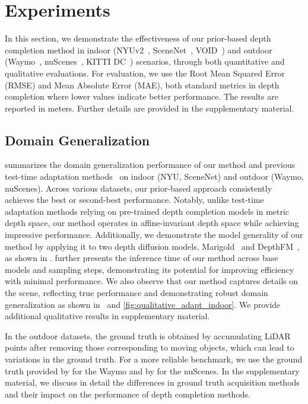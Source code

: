 
\section{Experiments}
In this section, we demonstrate the effectiveness of our prior-based depth completion method in indoor (NYUv2~\cite{silberman2012nyu}, SceneNet~\cite{mccormac2017scenenet}, VOID~\cite{wong2020void}) and outdoor (Waymo~\cite{sun2020waymo}, nuScenes~\cite{caesar2020nuscene}, KITTI DC~\cite{uhrig2017sparsity}) scenarios, through both quantitative and qualitative evaluations. 
For evaluation, we use the Root Mean Squared Error (RMSE) and Mean Absolute Error (MAE), both standard metrics in depth completion where lower values indicate better performance.
The results are reported in meters.
Further details are provided in the supplementary material.

\subsection{Domain Generalization}
\label{sec:exp_domain}
 summarizes the domain generalization performance of our method and previous test-time adaptation methods~\cite{wang2021tent,wang2022continual, park2024testtime} on indoor (NYU, SceneNet) and outdoor (Waymo, nuScenes).
Across various datasets, our prior-based approach consistently achieves the best or second-best performance.
 Notably, unlike test-time adaptation methods relying on pre-trained depth completion models in metric depth space, our method operates in affine-invariant depth space while achieving impressive performance.
Additionally, we demonstrate the model generality of our method by applying it to two depth diffusion models, Marigold~\cite{ke2023repurposing} and DepthFM~\cite{gui2024depthfm}, as shown in .
 further presents the inference time of our method across base models and sampling steps, demonstrating its potential for improving efficiency with minimal performance.
We also observe that our method captures details on the scene, reflecting true performance and demonstrating robust domain generalization as shown in~ and \ref{fig:qualitative_adapt_indoor}.
We provide additional qualitative results in supplementary material.



In the outdoor datasets, the ground truth is obtained by accumulating LiDAR points after removing those corresponding to moving objects, which can lead to variations in the ground truth. 
For a more reliable benchmark, we use the ground truth provided by \citet{park2024testtime} for the Waymo and by \citet{huang2022pcacc} for the nuScenes.
In the supplementary material, we discuss in detail the differences in ground truth acquisition methods and their impact on the performance of depth completion methods.

